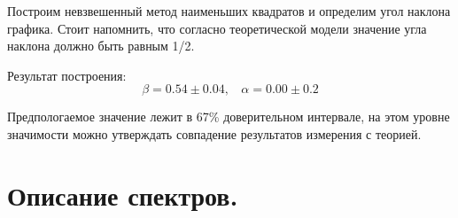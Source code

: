 Построим невзвешенный метод наименьших квадратов и определим угол наклона графика. Стоит напомнить, что согласно теоретической модели значение угла наклона должно быть равным 1/2.

Результат построения:
$$ \beta = 0.54 \pm 0.04,~~~~
 \alpha = 0.00 \pm 0.2$$
 
Предпологаемое значение лежит в 67\% доверительном интервале, на этом уровне значимости можно утверждать совпадение результатов измерения с теорией.

\newpage
\section{\label{sec:level1}Описание спектров.}






